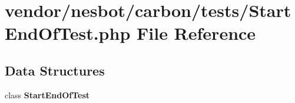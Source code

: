 \section{vendor/nesbot/carbon/tests/\+Start\+End\+Of\+Test.php File Reference}
\label{_start_end_of_test_8php}
\subsection*{Data Structures}
\begin{DoxyCompactItemize}
\item 
class {\bf Start\+End\+Of\+Test}
\end{DoxyCompactItemize}
